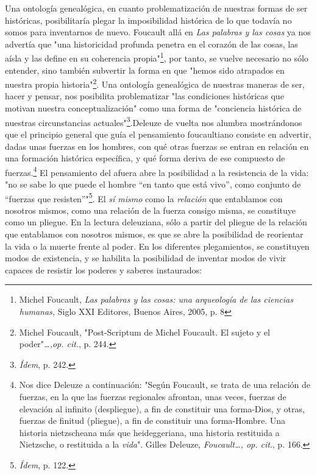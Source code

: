 \documentclass{book}
\begin{document}
Una ontología genealógica, en cuanto problematización de nuestras formas
de ser históricas, posibilitaría plegar la imposibilidad histórica de lo
que todavía no somos para inventarnos de nuevo. Foucault allá en
\emph{Las palabras y las cosas} ya nos advertía que "una historicidad
profunda penetra en el corazón de las cosas, las aísla y las define en
su coherencia propia"\footnote{Michel Foucault, \emph{Las palabras y las
  cosas: una arqueología de las ciencias humanas,} Siglo XXI Editores,
  Buenos Aires, 2005, p. 8}, por tanto, se vuelve necesario no sólo
entender, sino también subvertir la forma en que "hemos sido atrapados
en nuestra propia historia"\footnote{Michel Foucault, "Post-Scriptum de
  Michel Foucault. El sujeto y el poder"\emph{\ldots,op. cit}., p. 244.}.
Una ontología genealógica de nuestras maneras de ser, hacer y pensar,
nos posibilita problematizar "las condiciones históricas que motivan
nuestra conceptualización" como una forma de "conciencia histórica de
nuestras circunstancias actuales"\footnote{\emph{Ídem}, p. 242.}.Deleuze
de vuelta nos alumbra mostrándonos que el principio general que guía el
pensamiento foucaultiano consiste en advertir, dadas unas fuerzas en los
hombres, con qué otras fuerzas se entran en relación en una formación
histórica específica, y qué forma deriva de ese compuesto de
fuerzas.\footnote{Nos dice Deleuze a continuación: "Según Foucault, se
  trata de una relación de fuerzas, en la que las fuerzas regionales
  afrontan, unas veces, fuerzas de elevación al infinito (despliegue), a
  fin de constituir una forma-Dios, y otras, fuerzas de finitud
  (pliegue), a fin de constituir una forma-Hombre. Una historia
  nietzscheana más que heideggeriana, una historia restituida a
  Nietzsche, o restituida a la \emph{vida}". Gilles Deleuze,
  \emph{Foucault\ldots, op. cit}., p. 166.} El pensamiento del afuera
abre la posibilidad a la resistencia de la vida: "no se sabe lo que
puede el hombre ``en tanto que está vivo'', como conjunto de ``fuerzas
que resisten''"\footnote{\emph{Ídem}, p. 122.}. El \emph{sí mismo} como
la \emph{relación} que entablamos con nosotros mismos, como una relación
de la fuerza consigo misma, se constituye como un pliegue. En la lectura
deleuziana, sólo a partir del pliegue de la relación que entablamos con
nosotros mismos, es que se abre la posibilidad de reorientar la vida o
la muerte frente al poder. En los diferentes plegamientos, se
constituyen modos de existencia, y se habilita la posibilidad de
inventar modos de vivir capaces de resistir los poderes y saberes
instaurados:
\end{document}
